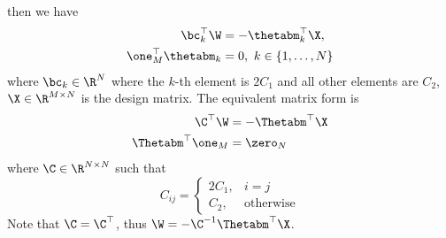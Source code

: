 then we have
\begin{equation*}
\begin{aligned}
\bc_k^\top \W &= -\thetabm_k^\top \X, \\
\one_M^\top \thetabm_k &= 0, \ k \in \{1,\dots,N\}
\end{aligned}
\end{equation*}
where $\bc_k \in \R^{N}$ where the $k$-th element is $2C_1$ and all other elements are $C_2$,
$\X \in \R^{M \times N}$ is the design matrix.
The equivalent matrix form is
\begin{equation}
\label{eq:wxi}
\begin{aligned}
\C^\top \W &= -\Thetabm^\top \X \\
\Thetabm^\top \one_M &= \zero_{N}
\end{aligned}
\end{equation}
where $\C \in \R^{N \times N}$ such that
\begin{equation*}
C_{ij} = \begin{cases}
2C_1, & i = j \\
C_2,  & \mathrm{otherwise}
\end{cases}
\end{equation*}
Note that $\C = \C^\top$, thus $\W = -\C^{-1} \Thetabm^\top \X$.

